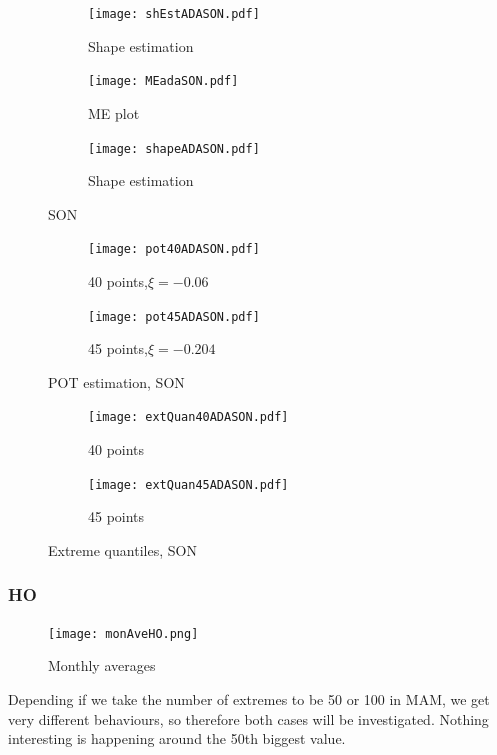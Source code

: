 \documentclass{article}
\begin{document}
	\begin{figure}[H]
		\begin{subfigure}{0.33\textwidth}
			\texttt{[image: shEstADASON.pdf]}
			\caption{Shape estimation}
		\end{subfigure}%
		\begin{subfigure}{0.33\textwidth}
			\texttt{[image: MEadaSON.pdf]}
			\caption{ME plot}
		\end{subfigure}%
		\begin{subfigure}{0.33\textwidth}
			\texttt{[image: shapeADASON.pdf]}
			\caption{Shape estimation}
		\end{subfigure}
		\caption{SON}
	\end{figure}
	
	\begin{figure}[H]
		\centering
		\begin{subfigure}{0.5\textwidth}
			\texttt{[image: pot40ADASON.pdf]}
			\caption{40 points,$\xi = -0.06$}
		\end{subfigure}%
		\begin{subfigure}{0.5\textwidth}
			\texttt{[image: pot45ADASON.pdf]}
			\caption{45 points,$\xi = -0.204$}
		\end{subfigure}
		\caption{POT estimation, SON}
	\end{figure}

		\begin{figure}[H]
		\centering
		\begin{subfigure}{0.5\textwidth}
			\texttt{[image: extQuan40ADASON.pdf]}
			\caption{40 points}
		\end{subfigure}%
		\begin{subfigure}{0.5\textwidth}
			\texttt{[image: extQuan45ADASON.pdf]}
			\caption{45 points}
		\end{subfigure}
		\caption{Extreme quantiles, SON}
	\end{figure}
	
	\subsubsection{HO}

	\begin{figure}[H]
		\centering
		\texttt{[image: monAveHO.png]}
		\caption{Monthly averages}
	\end{figure}
	
	Depending if we take the number of extremes to be 50 or 100 in MAM, we get very different behaviours, so therefore both cases will be investigated. Nothing interesting is happening around the 50th biggest value.
	
\end{document}
